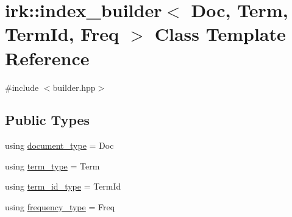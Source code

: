 \hypertarget{classirk_1_1index__builder}{}\section{irk\+:\+:index\+\_\+builder$<$ Doc, Term, Term\+Id, Freq $>$ Class Template Reference}
\label{classirk_1_1index__builder}


{\ttfamily \#include $<$builder.\+hpp$>$}

\subsection*{Public Types}
\begin{DoxyCompactItemize}
\item 
using \mbox{\hyperlink{classirk_1_1index__builder_a4230ae91e9f84c95ee99b3607c6e952e}{document\+\_\+type}} = Doc
\item 
using \mbox{\hyperlink{classirk_1_1index__builder_ad80a8f10f3e72ed3b9a2f181350f3f1f}{term\+\_\+type}} = Term
\item 
using \mbox{\hyperlink{classirk_1_1index__builder_a6736f4a9aa142d3ca15c5e8c3b0a352f}{term\+\_\+id\+\_\+type}} = Term\+Id
\item 
using \mbox{\hyperlink{classirk_1_1index__builder_af2efa68fc3f10fd9cb000d16279bfbb1}{frequency\+\_\+type}} = Freq
\end{DoxyCompactItemize}
